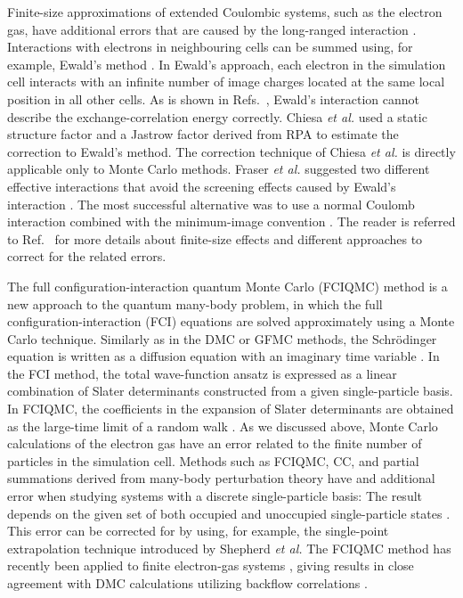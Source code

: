 \documentclass[aps,twocolumn,showpacs,floatfix,nofootinbib,preprintnumbers,superscriptaddress,amsmath,amssymb]{revtex4-1}
\begin{document}
Finite-size approximations of extended Coulombic systems, 
such as the electron gas, have additional errors that are 
caused by the long-ranged interaction \cite{fraser1996,chiesa2006,drummond2008}. 
Interactions with electrons in
neighbouring cells can be summed using, for example,
Ewald's method \cite{ewald1921,fraser1996,wood2004,drummond2008}. In 
Ewald's approach, each electron in the simulation cell
interacts with an infinite number of image charges located
at the same local position in all other cells. As is shown 
in Refs.~\cite{fraser1996,chiesa2006}, 
Ewald's interaction cannot describe the exchange-correlation
energy correctly. Chiesa \emph{et al.} \cite{chiesa2006}
used a static structure factor and a Jastrow factor
derived from RPA to estimate the correction to Ewald's
method. The correction technique of Chiesa \emph{et al.}
is directly applicable only to Monte Carlo methods.
Fraser \emph{et al.} \cite{fraser1996} suggested two 
different effective interactions that avoid the screening 
effects caused by Ewald's interaction . The most successful
alternative was to use a normal Coulomb interaction combined 
with the minimum-image convention \cite{fraser1996}.
The reader is referred to Ref.~\cite{drummond2008} for
more details about finite-size effects and different
approaches to correct for the related errors.


The full configuration-interaction quantum Monte Carlo 
(FCIQMC) met\-hod \cite{booth2009} is a new approach to the 
quantum many-body problem, in which the full 
configuration-interaction (FCI) equations \cite{harris1992} are 
solved approximately using a Monte Carlo technique. Similarly 
as in the DMC or GFMC methods, the Schr{\"o}dinger equation is 
written as a diffusion equation with an imaginary time 
variable \cite{shepherd2012a}. In the FCI method, the total 
wave-function ansatz 
is expressed as a linear combination of Slater determinants 
constructed from a given single-particle basis. In FCIQMC, 
the coefficients in the expansion of Slater determinants 
are obtained as the large-time limit of a random walk 
\cite{shepherd2012a}. As we discussed above, Monte Carlo
calculations of the electron gas have an error related to 
the finite number of particles in the simulation cell. 
Methods such as FCIQMC, CC, and partial summations derived 
from many-body perturbation theory have and additional error 
when studying systems with a discrete single-particle basis: 
The result depends on the given set of both occupied and 
unoccupied single-particle states \cite{shepherd2012b}. 
This error can be corrected for by using, for example, the 
single-point extrapolation technique \cite{shepherd2012b,
shepherd2012c} introduced by Shepherd \emph{et al.} The 
FCIQMC method has recently been applied to finite 
electron-gas systems \cite{shepherd2012a,shepherd2012b,
shepherd2012c}, giving results in close agreement
with DMC calculations utilizing backflow correlations 
\cite{shepherd2012a}. 
\end{document}
